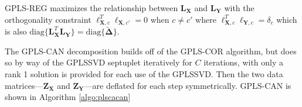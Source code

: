 \documentclass[12pt]{article}
\begin{document}
GPLS-REG maximizes the relationship between \({\mathbf L}_{\mathbf X}\)
and \({\mathbf L}_{\mathbf Y}\) with the orthogonality constraint
\({\boldsymbol \ell}_{{\mathbf X},c}^{T}{\boldsymbol \ell}_{{\mathbf X},c'} = 0\)
when \(c \neq c'\) where
\({\boldsymbol \ell}_{{\mathbf X},c}^{T}{\boldsymbol \ell}_{{\mathbf Y},c} = \delta_{c}\)
which is also
\(\mathrm{diag\{}{\mathbf L}_{\mathbf X}^{T}{\mathbf L}_{\mathbf Y}\mathrm{\}} = \mathrm{diag\{}\widetilde{\boldsymbol \Delta}\mathrm{\}}\).

The GPLS-CAN decomposition builds off of the GPLS-COR algorithm, but
does so by way of the GPLSSVD septuplet iteratively for \(C\)
iterations, with only a rank 1 solution is provided for each use of the
GPLSSVD. Then the two data matrices---\({\mathbf Z}_{\mathbf X}\) and
\({\mathbf Z}_{\mathbf Y}\)---are deflated for each step symmetrically.
GPLS-CAN is shown in Algorithm \ref{algo:plscacan}
\end{document}
